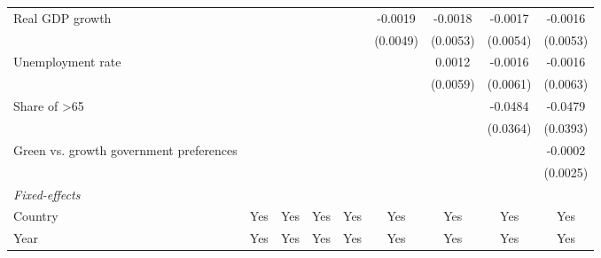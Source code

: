 \begin{table}[htbp]
\begin{tabular}{lcccccccc}
      Real GDP growth                                                                 &                       &          &                 &                 & -0.0019         & -0.0018         & -0.0017         & -0.0016\\   
                                                                                      &                       &          &                 &                 & (0.0049)        & (0.0053)        & (0.0054)        & (0.0053)\\   
      Unemployment rate                                                               &                       &          &                 &                 &                 & 0.0012          & -0.0016         & -0.0016\\   
                                                                                      &                       &          &                 &                 &                 & (0.0059)        & (0.0061)        & (0.0063)\\   
      Share of >65                                                                    &                       &          &                 &                 &                 &                 & -0.0484         & -0.0479\\   
                                                                                      &                       &          &                 &                 &                 &                 & (0.0364)        & (0.0393)\\   
      Green vs. growth government preferences                                         &                       &          &                 &                 &                 &                 &                 & -0.0002\\   
                                                                                      &                       &          &                 &                 &                 &                 &                 & (0.0025)\\   
      \midrule
      \emph{Fixed-effects}\\
      Country                                                                         & Yes                   & Yes      & Yes             & Yes             & Yes             & Yes             & Yes             & Yes\\  
      Year                                                                            & Yes                   & Yes      & Yes             & Yes             & Yes             & Yes             & Yes             & Yes\\  

\end{tabular}
\end{table}
